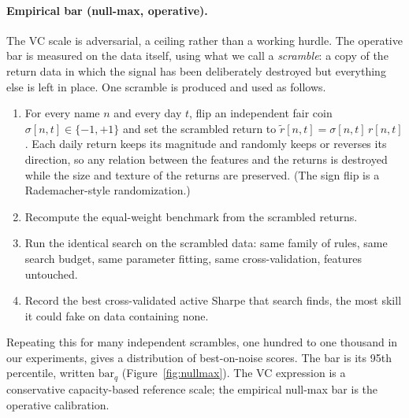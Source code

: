 \documentclass[11pt]{article}
\begin{document}
\paragraph{Empirical bar (null-max, operative).} The VC scale is adversarial, a ceiling rather than a
working hurdle. The operative bar is measured on the data itself, using what we call a \emph{scramble}: a
copy of the return data in which the signal has been deliberately destroyed but everything else is left
in place. One scramble is produced and used as follows.
\begin{enumerate}[leftmargin=1.6em]
\item For every name $n$ and every day $t$, flip an independent fair coin
$\sigma[n,t]\in\{-1,+1\}$ and set the scrambled return to $\tilde r[n,t]=\sigma[n,t]\,r[n,t]$. Each daily
return keeps its magnitude and randomly keeps or reverses its direction, so any relation between the
features and the returns is destroyed while the size and texture of the returns are preserved. (The sign
flip is a Rademacher-style randomization.)
\item Recompute the equal-weight benchmark from the scrambled returns.
\item Run the identical search on the scrambled data: same family of rules, same search budget, same
parameter fitting, same cross-validation, features untouched.
\item Record the best cross-validated active Sharpe that search finds, the most skill it could fake on
data containing none.
\end{enumerate}
Repeating this for many independent scrambles, one hundred to one thousand in our experiments, gives a
distribution of best-on-noise scores. The bar is its 95th percentile, written $\mathrm{bar}_q$
(Figure~\ref{fig:nullmax}). The VC expression is a conservative capacity-based reference scale; the
empirical null-max bar is the operative calibration.
\end{document}
